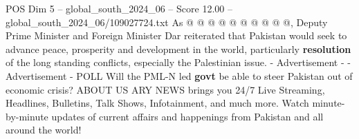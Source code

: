 \begin{textsample}{POS Dim 5 – global\_south\_2024\_06 – Score 12.00 – global\_south\_2024\_06/109027724.txt}
As @ @ @ @ @ @ @ @ @ @, Deputy Prime Minister and Foreign Minister Dar reiterated that Pakistan would seek to advance peace, prosperity and development in the world, particularly \textbf{resolution} of the long standing conflicts, especially the Palestinian issue. - Advertisement - - Advertisement - POLL Will the PML-N led \textbf{govt} be able to steer Pakistan out of economic crisis?
ABOUT US ARY NEWS brings you 24/7 Live Streaming, Headlines, Bulletins, Talk Shows, Infotainment, and much more.
Watch minute-by-minute updates of current affairs and happenings from Pakistan and all around the world!

\end{textsample}
